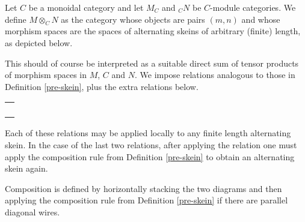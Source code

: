 \begin{definition}\label{pre-skein_no-duals}

  \noindent Let $C$ be a monoidal category and let $M_C$ and $_{C}N$ be
  $C$-module categories. We define $M\otimes_C N$ as the category whose
  objects are pairs $(m,n)$ and whose morphism spaces are the spaces of
  alternating skeins of arbitrary (finite) length, as depicted below.

  \begin{center}
    
  \end{center}

  This should of course be interpreted as a suitable direct sum of tensor
  products of morphism spaces in $M$, $C$ and $N$. We impose relations
  analogous to those in Definition \ref{pre-skein}, plus the extra relations
  below.

  \begin{center}
    \begin{tabular}{l}
       \\
       \\
       \\
       \\
       \\
      
    \end{tabular}
  \end{center}

  Each of these relations may be applied locally to any finite length
  alternating skein. In the case of the last two relations, after applying the
  relation one must apply the composition rule from Definition \ref{pre-skein}
  to obtain an alternating skein again.

  Composition is defined by horizontally stacking the two diagrams and then
  applying the composition rule from Definition \ref{pre-skein} if there are
  parallel diagonal wires.
\end{definition}

